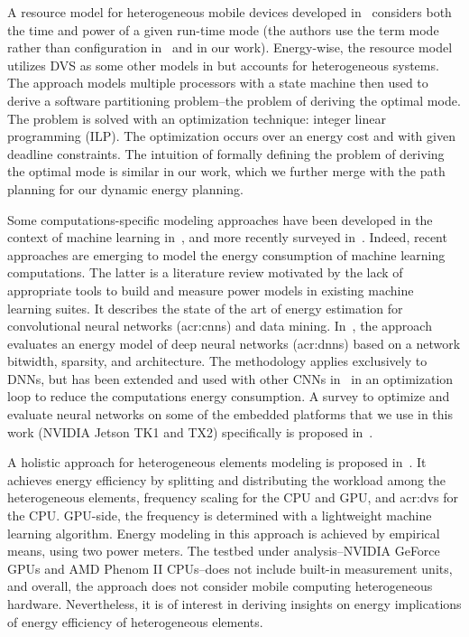 A resource model for heterogeneous mobile devices developed in~\citep{goraczko2008energy} considers both the time and power of a given run-time mode (the authors use the term mode rather than configuration in~\citep{marowka2017energy,bailey2014adaptive} and in our work). Energy-wise, the resource model utilizes DVS as some other models in  but accounts for heterogeneous systems. The approach models multiple processors with a state machine then used to derive a software partitioning problem--the problem of deriving the optimal mode. The problem is solved with an optimization technique: integer linear programming (ILP). The optimization occurs over an energy cost and with given deadline constraints. The intuition of formally defining the problem of deriving the optimal mode is similar in our work, which we further merge with the path planning for our dynamic energy planning.

Some computations-specific modeling approaches have been developed in the context of machine learning in~\citep{yang2017method}, and more recently surveyed in~\citep{garcia2019estimation}. Indeed, recent approaches are emerging to model the energy consumption of machine learning computations. The latter is a literature review motivated by the lack of appropriate tools to build and measure power models in existing machine learning suites. It describes the state of the art of energy estimation for convolutional neural networks (\Gls{acr:cnn}s) and data mining. In~\citep{yang2017method}, the approach evaluates an energy model of deep neural networks (\Gls{acr:dnn}s) based on a network bitwidth, sparsity, and architecture. The methodology applies exclusively to DNNs, but has been extended and used with other CNNs in~\citep{yang2017designing} in an optimization loop to reduce the computations energy consumption. A survey to optimize and evaluate neural networks on some of the embedded platforms that we use in this work (NVIDIA Jetson TK1 and TX2) specifically is proposed in~\citep{mittal2019survey}. 

A holistic approach for heterogeneous elements modeling is proposed in~\citep{ma2012holistic}. It achieves energy efficiency by splitting and distributing the workload among the heterogeneous elements, frequency scaling for the CPU and GPU, and \Gls{acr:dvs} for the CPU. GPU-side, the frequency is determined with a lightweight machine learning algorithm. Energy modeling in this approach is achieved by empirical means, using two power meters. The testbed under analysis--NVIDIA GeForce GPUs and AMD Phenom II CPUs--does not include built-in measurement units, and overall, the approach does not consider mobile computing heterogeneous hardware. Nevertheless, it is of interest in deriving insights on energy implications of energy efficiency of heterogeneous elements. 


